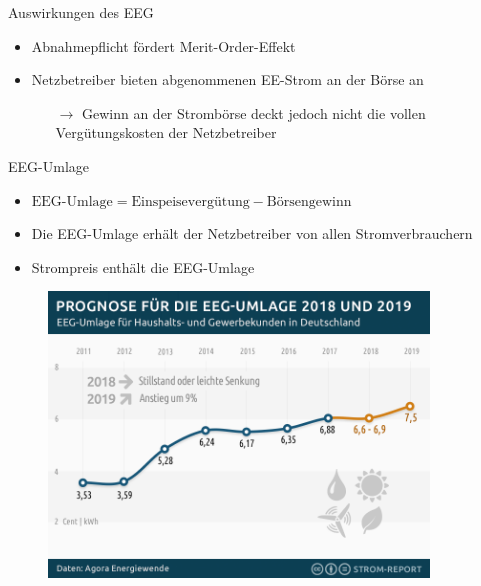 \documentclass[aspectratio=1610, professionalfonts, 9pt]{beamer}
\begin{document}
\begin{frame}{Auswirkungen des EEG}
  \begin{itemize}
    \item Abnahmepflicht fördert Merit-Order-Effekt
    \item Netzbetreiber bieten abgenommenen EE-Strom an der Börse an
\begin{itemize}
  \item[$\rightarrow$] Gewinn an der Strombörse deckt jedoch nicht die vollen Vergütungskosten der Netzbetreiber
\end{itemize}
\end{itemize}
\begin{block}{EEG-Umlage}
\begin{itemize}
  \item $\text{EEG-Umlage}=\text{Einspeisevergütung}-\text{Börsengewinn}$
\item Die EEG-Umlage erhält der Netzbetreiber von allen Stromverbrauchern
\item Strompreis enthält die EEG-Umlage
\end{itemize}
\end{block}
\end{frame}

{
\begin{frame}
  \begin{figure}
  \includegraphics[width=0.9\textwidth]{images/eeg-umlage-2018-2019.png}
  \end{figure}
\end{frame}
}
\end{document}
